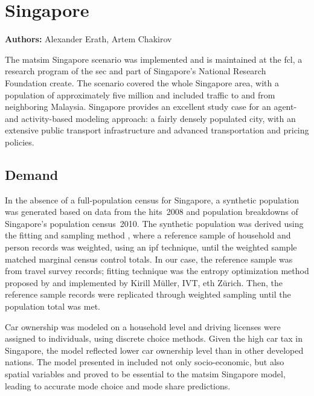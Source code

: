 \chapter{Singapore}
\label{ch:singapore}
\hfill \textbf{Authors:} Alexander Erath, Artem Chakirov


The \gls{matsim} Singapore scenario \citet[][]{ErathEtAl_TechRep_FCL_forth} was implemented and is maintained at the \gls{fcl}, a research program of the \gls{sec} and part of Singapore's National Research Foundation \gls{create}. The scenario covered the whole Singapore area, with a population of approximately five million and included traffic to and from neighboring Malaysia. Singapore provides an excellent study case for an agent- and activity-based modeling approach: a fairly densely populated city, with an extensive public transport infrastructure and advanced transportation and pricing policies. 

\section{Demand}
In the absence of a full-population census for Singapore, a synthetic population was generated based on data from the \gls{hits}~2008 \citep[][]{Choi_JOUR_2010} and population breakdowns of Singapore’s population census~2010. The synthetic population was derived using the fitting and sampling method \citep{MuellerKAxhausen_TRB_2011}, where a reference sample of household and person records was weighted, using an \gls{ipf} technique, until the weighted sample matched marginal census control totals. In our case, the reference sample was from travel survey records; fitting technique was the entropy optimization method proposed by \citet[][]{BarGeraEtAl_TRB_2009} and implemented by Kirill Müller, IVT, \gls{eth} Zürich. Then, the reference sample records were replicated through weighted sampling until the population total was met. 
 
Car ownership was modeled on a household level and driving licenses were assigned to individuals, using discrete choice methods. Given the high car tax in Singapore, the model reflected lower car ownership level than in other developed nations. The model presented in \citet[][]{VanEggermondEtAl_IATBR_2012} included not only socio-economic, but also spatial variables and proved to be essential to the \gls{matsim} Singapore model, leading to accurate mode choice and mode share predictions. 


